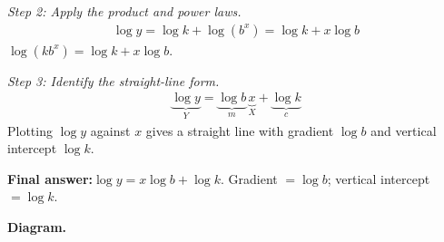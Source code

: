 \documentclass[11pt]{article}
\begin{document}
\textit{Step 2: Apply the product and power laws.}
\[\begin{gathered}
\log y = \log k + \log(b^x) = \log k + x\log b
\end{gathered}\]
\( \log(kb^x) = \log k + x\log b \).

\textit{Step 3: Identify the straight-line form.}
\[\begin{gathered}
\underbrace{\log y}_{Y} = \underbrace{\log b}_{m}\,\underbrace{x}_{X} + \underbrace{\log k}_{c}
\end{gathered}\]
Plotting \( \log y \) against \( x \) gives a straight line with gradient \( \log b \) and vertical intercept \( \log k \).

\begin{answerbox}
\textbf{Final answer:}\quad \(\displaystyle  \log y = x\log b + \log k \). Gradient \(\displaystyle  = \log b \); vertical intercept \(\displaystyle  = \log k \).
\end{answerbox}
\textbf{Diagram.}
\end{document}
